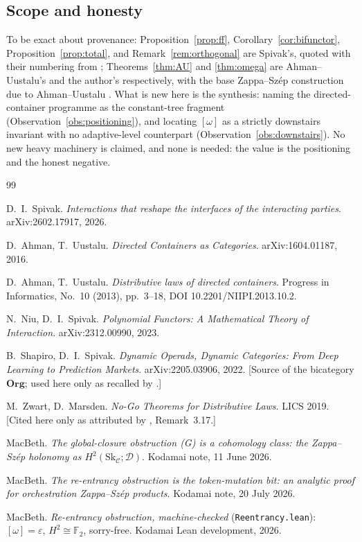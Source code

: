 \documentclass[11pt]{amsart}
\theoremstyle{definition}
\theoremstyle{remark}
\newcommand{\Org}{\mathbf{Org}}
\newcommand{\C}{\mathcal{C}}
\newcommand{\Sk}{\mathrm{Sk}}
\newcommand{\dir}{\mathcal{D}}
\begin{document}
\subsection*{Scope and honesty}
To be exact about provenance: Proposition~\ref{prop:ff}, Corollary~\ref{cor:bifunctor},
Proposition~\ref{prop:total}, and Remark~\ref{rem:orthogonal} are Spivak's, quoted with
their numbering from \cite{SpivakOrgTr}; Theorems~\ref{thm:AU} and \ref{thm:omega} are
Ahman--Uustalu's \cite{AhmanUustalu} and the author's \cite{gobstr} respectively, with the
base Zappa--Szép construction due to Ahman--Uustalu \cite{AhmanUustaluDL}. What is new here
is the synthesis: naming the directed-container programme as the constant-tree fragment
(Observation~\ref{obs:positioning}), and locating $[\omega]$ as a strictly downstairs
invariant with no adaptive-level counterpart (Observation~\ref{obs:downstairs}). No new
heavy machinery is claimed, and none is needed: the value is the positioning and the honest
negative.

\begin{thebibliography}{99}

 D.~I.~Spivak. \emph{Interactions that reshape the interfaces of the
interacting parties}. arXiv:2602.17917, 2026.

 D.~Ahman, T.~Uustalu. \emph{Directed Containers as Categories}.
arXiv:1604.01187, 2016.

 D.~Ahman, T.~Uustalu. \emph{Distributive laws of directed
containers}. Progress in Informatics, No.~10 (2013), pp.~3--18, DOI
10.2201/NIIPI.2013.10.2.

 N.~Niu, D.~I.~Spivak. \emph{Polynomial Functors: A Mathematical Theory
of Interaction}. arXiv:2312.00990, 2023.

 B.~Shapiro, D.~I.~Spivak. \emph{Dynamic Operads, Dynamic
Categories: From Deep Learning to Prediction Markets}. arXiv:2205.03906, 2022. [Source of
the bicategory $\Org$; used here only as recalled by \cite{SpivakOrgTr}.]

 M.~Zwart, D.~Marsden. \emph{No-Go Theorems for Distributive Laws}.
LICS 2019. [Cited here only as attributed by \cite{SpivakOrgTr}, Remark~3.17.]

 MacBeth. \emph{The global-closure obstruction \textnormal{(G)} is a
cohomology class: the Zappa--Sz\'ep holonomy as $H^2(\Sk_\C;\dir)$}. Kodamai note, 11 June
2026.

 MacBeth. \emph{The re-entrancy obstruction is the token-mutation bit: an
analytic proof for orchestration Zappa--Sz\'ep products}. Kodamai note, 20 July 2026.

 MacBeth. \emph{Re-entrancy obstruction, machine-checked}
(\texttt{Reentrancy.lean}): $[\omega]=\varepsilon$, $H^2\cong\mathbb{F}_2$, sorry-free.
Kodamai Lean development, 2026.

\end{thebibliography}
\end{document}
